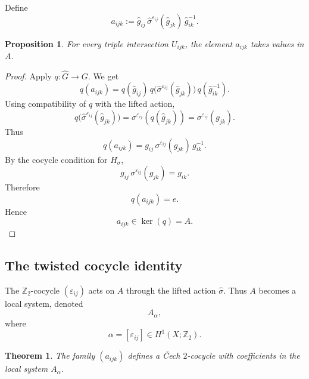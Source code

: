 \documentclass[11pt]{amsart}
\newtheorem{theorem}[definition]{Theorem}
\newtheorem{proposition}[definition]{Proposition}
\begin{document}
Define
\[
a_{ijk}
:=
\widehat g_{ij}\,
\widehat\sigma^{\varepsilon_{ij}}(\widehat g_{jk})\,
\widehat g_{ik}^{-1}.
\]

\begin{proposition}
For every triple intersection \(U_{ijk}\), the element \(a_{ijk}\) takes values in \(A\).
\end{proposition}

\begin{proof}
Apply \(q:\widehat G\to G\). We get
\[
q(a_{ijk})
=
q(\widehat g_{ij})\,
q\bigl(\widehat\sigma^{\varepsilon_{ij}}(\widehat g_{jk})\bigr)\,
q(\widehat g_{ik}^{-1}).
\]
Using compatibility of \(q\) with the lifted action,
\[
q\bigl(\widehat\sigma^{\varepsilon_{ij}}(\widehat g_{jk})\bigr)
=
\sigma^{\varepsilon_{ij}}(q(\widehat g_{jk}))
=
\sigma^{\varepsilon_{ij}}(g_{jk}).
\]
Thus
\[
q(a_{ijk})
=
g_{ij}\,\sigma^{\varepsilon_{ij}}(g_{jk})\,g_{ik}^{-1}.
\]
By the cocycle condition for \(H_\sigma\),
\[
g_{ij}\,\sigma^{\varepsilon_{ij}}(g_{jk})=g_{ik}.
\]
Therefore
\[
q(a_{ijk})=e.
\]
Hence
\[
a_{ijk}\in \ker(q)=A.
\]
\end{proof}

\subsection{The twisted cocycle identity}

The \(\mathbb Z_2\)-cocycle \((\varepsilon_{ij})\) acts on \(A\) through the lifted action \(\widehat\sigma\). Thus \(A\) becomes a local system, denoted
\[
A_\alpha,
\]
where
\[
\alpha=[\varepsilon_{ij}]\in H^1(X;\mathbb Z_2).
\]

\begin{theorem}
The family \((a_{ijk})\) defines a Čech \(2\)-cocycle with coefficients in the local system \(A_\alpha\).
\end{theorem}
\end{document}
